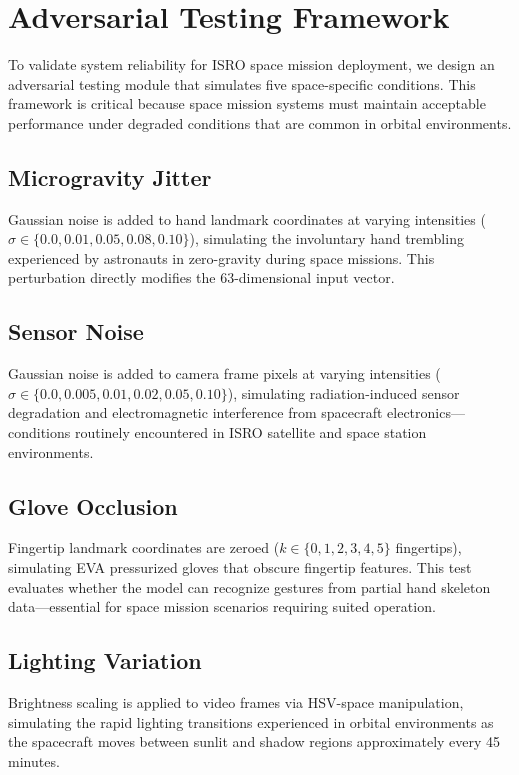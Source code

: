 \documentclass[conference]{IEEEtran}
\begin{document}
\section{Adversarial Testing Framework}

To validate system reliability for ISRO space mission deployment, we design an adversarial testing module that simulates five space-specific conditions. This framework is critical because space mission systems must maintain acceptable performance under degraded conditions that are common in orbital environments.

\subsection{Microgravity Jitter}
Gaussian noise is added to hand landmark coordinates at varying intensities ($\sigma \in \{0.0, 0.01, 0.05, 0.08, 0.10\}$), simulating the involuntary hand trembling experienced by astronauts in zero-gravity during space missions. This perturbation directly modifies the 63-dimensional input vector.

\subsection{Sensor Noise}
Gaussian noise is added to camera frame pixels at varying intensities ($\sigma \in \{0.0, 0.005, 0.01, 0.02, 0.05, 0.10\}$), simulating radiation-induced sensor degradation and electromagnetic interference from spacecraft electronics—conditions routinely encountered in ISRO satellite and space station environments.

\subsection{Glove Occlusion}
Fingertip landmark coordinates are zeroed ($k \in \{0, 1, 2, 3, 4, 5\}$ fingertips), simulating EVA pressurized gloves that obscure fingertip features. This test evaluates whether the model can recognize gestures from partial hand skeleton data—essential for space mission scenarios requiring suited operation.

\subsection{Lighting Variation}
Brightness scaling is applied to video frames via HSV-space manipulation, simulating the rapid lighting transitions experienced in orbital environments as the spacecraft moves between sunlit and shadow regions approximately every 45 minutes.
\end{document}
